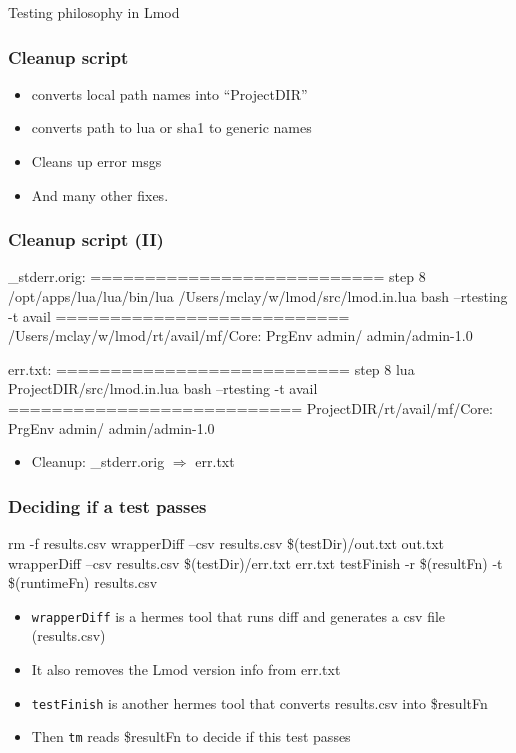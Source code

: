 \documentclass{beamer}
\begin{document}
\begin{rame}{Testing philosophy in Lmod}
\begin{frame}[fragile]
  \frametitle{Cleanup script}
    {\tiny
\begin{semiverbatim}
\end{semiverbatim}
    }
    \begin{itemize}
      \item converts local path names into ``ProjectDIR''
      \item converts path to lua or sha1 to generic names
      \item Cleans up error msgs 
      \item And many other fixes.
    \end{itemize}
\end{frame}

\begin{frame}[fragile]
  \frametitle{Cleanup script (II)}
    {\tiny
\begin{semiverbatim}
{\color{blue} \_stderr.orig}:
===========================
step 8
/opt/apps/lua/lua/bin/lua /Users/mclay/w/lmod/src/lmod.in.lua bash --rtesting -t avail
===========================
/Users/mclay/w/lmod/rt/avail/mf/Core:
PrgEnv
admin/
admin/admin-1.0
    
{\color{blue} err.txt}:
===========================
step 8
lua ProjectDIR/src/lmod.in.lua bash --rtesting -t avail
===========================
ProjectDIR/rt/avail/mf/Core:
PrgEnv
admin/
admin/admin-1.0
\end{semiverbatim}
    }
    \begin{itemize}
      \item Cleanup: \_stderr.orig $\Rightarrow$ err.txt
    \end{itemize}
\end{frame}

\begin{frame}[fragile]
  \frametitle{Deciding if a test passes}
    {\tiny
\begin{semiverbatim}
rm -f results.csv
wrapperDiff --csv results.csv \$(testDir)/out.txt out.txt
wrapperDiff --csv results.csv \$(testDir)/err.txt err.txt
testFinish -r \$(resultFn) -t \$(runtimeFn) results.csv
\end{semiverbatim}
    }
    \begin{itemize}
      \item \texttt{wrapperDiff} is a hermes tool that runs diff and
        generates a csv file (results.csv)
      \item It also removes the Lmod version info from err.txt
      \item \texttt{testFinish} is another hermes tool that converts
        results.csv into \$resultFn
      \item Then \texttt{tm} reads \$resultFn to decide if this test passes
    \end{itemize}
\end{frame}


\end{rame}
\end{document}
